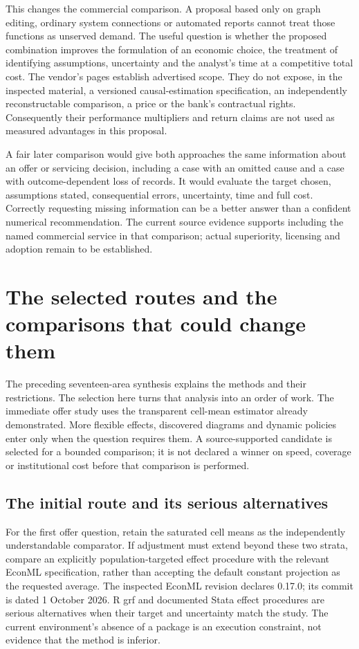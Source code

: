 This changes the commercial comparison. A proposal based only on graph editing,
ordinary system connections or automated reports cannot treat those functions
as unserved demand. The useful question is whether the proposed combination
improves the formulation of an economic choice, the treatment of identifying
assumptions, uncertainty and the analyst's time at a competitive total cost.
The vendor's pages establish advertised scope. They do not expose, in the
inspected material, a versioned causal-estimation specification, an independently
reconstructable comparison, a price or the bank's contractual rights.
Consequently their performance multipliers and return claims are not used as
measured advantages in this proposal. \citep{survey29causalens}

A fair later comparison would give both approaches the same information about
an offer or servicing decision, including a case with an omitted cause and a
case with outcome-dependent loss of records. It would evaluate the target
chosen, assumptions stated, consequential errors, uncertainty, time and full
cost. Correctly requesting missing information can be a better answer than a
confident numerical recommendation. The current source evidence supports
including the named commercial service in that comparison; actual superiority,
licensing and adoption remain to be established.


\section{The selected routes and the comparisons that could change them}
\label{rewrite:software-selection}

The preceding seventeen-area synthesis explains the methods and their
restrictions. The selection here turns that analysis into an order of work.
The immediate offer study uses the transparent cell-mean estimator already
demonstrated. More flexible effects, discovered diagrams and dynamic policies
enter only when the question requires them. A source-supported candidate is
selected for a bounded comparison; it is not declared a winner on speed,
coverage or institutional cost before that comparison is performed.

\subsection{The initial route and its serious alternatives}
For the first offer question, retain the saturated cell means as the
independently understandable comparator. If adjustment must extend beyond
these two strata, compare an explicitly population-targeted effect procedure
with the relevant EconML specification, rather than accepting the default
constant projection as the requested average. The inspected EconML revision
declares 0.17.0; its commit is dated 1 October 2026. R grf and documented
Stata effect procedures are serious alternatives when their target and
uncertainty match the study. The current environment's absence of a package
is an execution constraint, not evidence that the method is inferior.
\citep{exec19_econml_source,exec13_grf_rpath,exec13_ch_stata}

